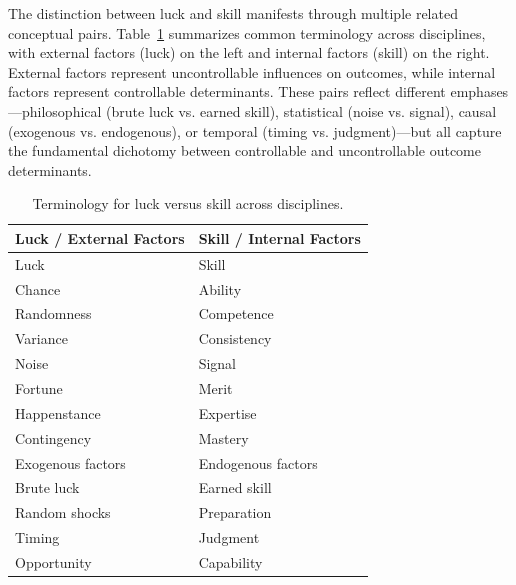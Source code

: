 The distinction between luck and skill manifests through multiple related
conceptual pairs. Table~\ref{tab:terminology} summarizes common
terminology across disciplines, with external factors (luck) on the left
and internal factors (skill) on the right. External factors represent
uncontrollable influences on outcomes, while internal factors represent
controllable determinants. These pairs reflect different
emphases—philosophical (brute luck vs. earned skill), statistical (noise
vs. signal), causal (exogenous vs. endogenous), or temporal (timing vs.
judgment)—but all capture the fundamental dichotomy between controllable
and uncontrollable outcome determinants.

\begin{table}[H]
  \centering
  \begin{tabular}{ll}
    \toprule \textbf{Luck / External Factors} & \textbf{Skill / Internal Factors} \\
    \midrule Luck                             & Skill                             \\
    Chance                                    & Ability                           \\
    Randomness                                & Competence                        \\
    Variance                                  & Consistency                       \\
    Noise                                     & Signal                            \\
    Fortune                                   & Merit                             \\
    Happenstance                              & Expertise                         \\
    Contingency                               & Mastery                           \\
    Exogenous factors                         & Endogenous factors                \\
    Brute luck                                & Earned skill                      \\
    Random shocks                             & Preparation                       \\
    Timing                                    & Judgment                          \\
    Opportunity                               & Capability                        \\
    \bottomrule
  \end{tabular}
  \caption{Terminology for luck versus skill across disciplines.}
  \label{tab:terminology}
\end{table}

